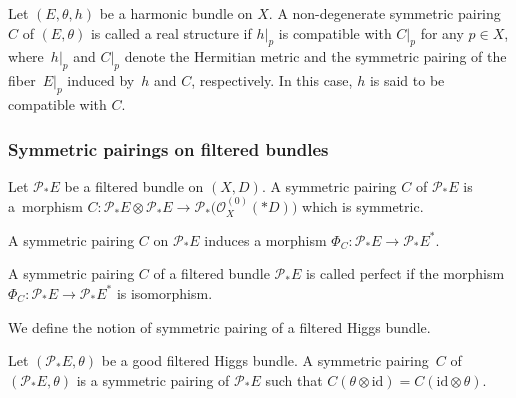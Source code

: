 \documentclass[pdftex]{sigma}
\numberwithin{equation}{section}
\newcommand{\id}{\mathrm{id}}
\newcommand{\strsheaf}{\mathcal{O}}
\begin{document}
\begin{Definition}
 Let $(E,\theta,h)$ be a harmonic bundle on $X$. A non-degenerate symmetric pairing~$C$ of $(E,\theta)$ is called a real structure if $h|_p$ is compatible with $C|_p$ for any $p\in X$, where~$h|_p$ and $C|_p$ denote the Hermitian metric and the symmetric pairing of the fiber~$E|_p$ induced by~$h$ and $C$, respectively. In this case, $h$ is said to be compatible with $C$.
\end{Definition}

\subsubsection{Symmetric pairings on filtered bundles}
\begin{Definition}
 Let $\mathcal{P}_{*}E$ be a filtered bundle on $(X,D)$. A symmetric pairing $C$ of $\mathcal{P}_{*}E$ is a~morphism $C\colon \mathcal{P}_{*}E\otimes \mathcal{P}_{*}E\to \mathcal{P}_{*} \bigl(\strsheaf_{X}^{(0)} (*D)\bigr)$ which is symmetric.
\end{Definition}
A symmetric pairing $C$ on $\mathcal{P}_{*}E$ induces a morphism $\Phi_C\colon \mathcal{P}_{*}E\to \mathcal{P}_{*}E^{*}$.
\begin{Definition}
 A symmetric pairing $C$ of a filtered bundle $\mathcal{P}_{*}E$ is called perfect if the morphism $\Phi_C\colon \mathcal{P}_{*}E\to\mathcal{P}_{*}E^{*}$ is isomorphism.
\end{Definition}
We define the notion of symmetric pairing of a filtered Higgs bundle.
\begin{Definition}
 Let $(\mathcal{P}_{*}E,\theta)$ be a good filtered Higgs bundle. A symmetric pairing~$C$ of~$(\mathcal{P}_{*}E,\theta)$ is a symmetric pairing of $\mathcal{P}_{*}E$ such that $C(\theta\otimes\id)=C(\id\otimes\theta)$.
\end{Definition}
\end{document}
